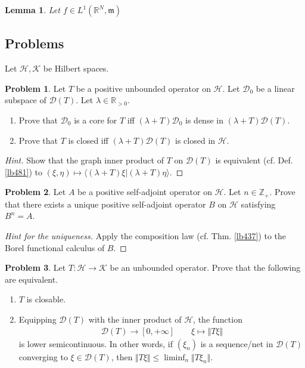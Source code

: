\documentclass[12pt,b5paper,notitlepage]{article}
\theoremstyle{definition}
\newtheorem{prob}{\color{red}Problem}[section]
\theoremstyle{plain}
\newtheorem{lm}[df]{Lemma}
\newcommand{\Dom}{\mathscr{D}}
\newcommand{\bk}[1]{\langle {#1}\rangle}
\newcommand{\Zbb}{\mathbb Z}
\newcommand{\Rbb}{\mathbb R}
\newcommand{\mk}{\mathfrak m}
\newcommand{\MH}{\mathcal H}
\newcommand{\MK}{\mathcal K}
\numberwithin{equation}{section}
\begin{document}
\begin{lm}
Let $f\in L^1(\Rbb^N,\mk)$
\end{lm}







\subsection{Problems}


Let $\MH,\MK$ be Hilbert spaces.


\begin{prob}\label{lb482}
Let $T$ be a positive unbounded operator on $\MH$. Let $\Dom_0$ be a linear subspace of $\Dom(T)$. Let $\lambda\in\Rbb_{>0}$.
\begin{enumerate}
\item Prove that $\Dom_0$ is a core for $T$ iff $(\lambda+T)\Dom_0$ is dense in $(\lambda+T)\Dom(T)$.
\item Prove that $T$ is closed iff $(\lambda+T)\Dom(T)$ is closed in $\MH$.
\end{enumerate} 
\end{prob}

\begin{proof}[Hint]
Show that the graph inner product of $T$ on $\Dom(T)$ is equivalent (cf. Def. \ref{lb481}) to $(\xi,\eta)\mapsto\bk{(\lambda+T)\xi|(\lambda+T)\eta}$.
\end{proof}


\begin{prob}
Let $A$ be a positive self-adjoint operator on $\MH$. Let $n\in\Zbb_+$. Prove that there exists a unique positive self-adjoint operator $B$ on $\MH$ satisfying $B^n=A$.
\end{prob}


\begin{proof}[Hint for the uniqueness]
Apply the composition law (cf. Thm. \ref{lb437}) to the Borel functional calculus of $B$.
\end{proof}


\begin{prob}
Let $T:\MH\rightarrow\MK$ be an unbounded operator. Prove that the following are equivalent.
\begin{enumerate}
\item[(1)] $T$ is closable.
\item[(2)] Equipping $\Dom(T)$ with the inner product of $\MH$, the function
\begin{align*}
\Dom(T)\rightarrow[0,+\infty]\qquad \xi\mapsto \Vert T\xi\Vert
\end{align*} 
is lower semicontinuous. In other words, if $(\xi_n)$ is a sequence/net in $\Dom(T)$ converging to $\xi\in\Dom(T)$, then $\Vert T\xi\Vert\leq\liminf_n\Vert T\xi_n\Vert$.
\end{enumerate}
\end{prob}
\end{document}
